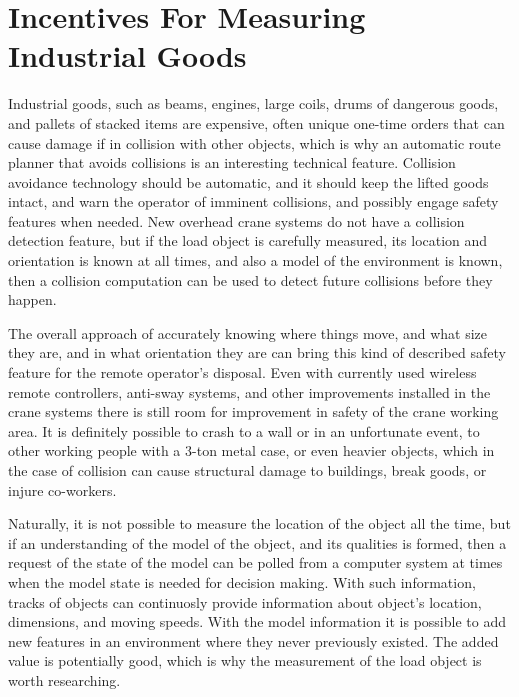 \documentclass[12pt,a4paper,oneside,pdftex]{report}
\begin{document}
\section{Incentives For Measuring Industrial Goods}
\label{section:incentives_for_measuring_industrial_goods}

Industrial goods, such as beams, engines, large coils, drums of dangerous goods, and pallets of stacked items are expensive, often unique one-time orders that can cause damage if in collision with other objects, which is why an automatic route planner that avoids collisions is an interesting technical feature. Collision avoidance technology should be automatic, and it should keep the lifted goods intact, and warn the operator of imminent collisions, and possibly engage safety features when needed. New overhead crane systems do not have a collision detection feature, but if the load object is carefully measured, its location and orientation is known at all times, and also a model of the environment is known, then a collision computation can be used to detect future collisions before they happen.\par

The overall approach of accurately knowing where things move, and what size they are, and in what orientation they are can bring this kind of described safety feature for the remote operator's disposal. Even with currently used wireless remote controllers, anti-sway systems, and other improvements installed in the crane systems there is still room for improvement in safety of the crane working area. It is definitely possible to crash to a wall or in an unfortunate event, to other working people with a 3-ton metal case, or even heavier objects, which in the case of collision can cause structural damage to buildings, break goods, or injure co-workers.

Naturally, it is not possible to measure the location of the object all the time, but if an understanding of the model of the object, and its qualities is formed, then a request of the state of the model can be polled from a computer system at times when the model state is needed for decision making. With such information, tracks of objects can continuosly provide information about object's location, dimensions, and moving speeds. With the model information it is possible to add new features in an environment where they never previously existed. The added value is potentially good, which is why the measurement of the load object is worth researching.
\end{document}
